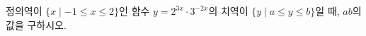 정의역이 $\{x \mid -1\le x\le 2\}$인 함수 $y=2^{3x}\cdot 3^{-2x}$의 치역이 $\{y \mid a\le y\le b\}$일 때, $ab$의 값을 구하시오.
